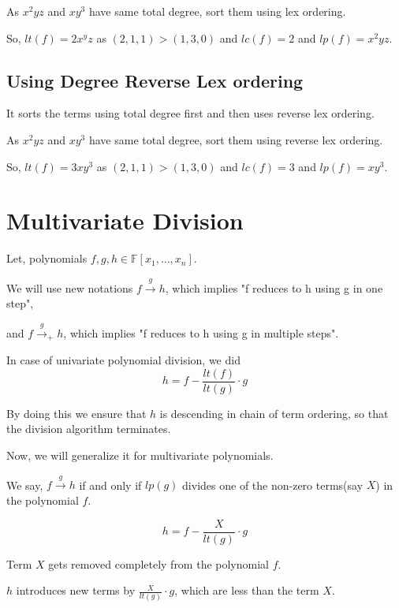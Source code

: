 As $x^2yz$ and $xy^3$ have same total degree, sort them using lex ordering.

So,  $lt(f) = 2x^yz$ as $(2,1,1)>(1,3,0)$ and $lc(f) = 2$ and $lp(f) = x^2yz$.

\subsection{Using Degree Reverse Lex ordering}

It sorts the terms using total degree first and then uses reverse lex ordering.

As $x^2yz$ and $xy^3$ have same total degree, sort them using reverse lex ordering.

So,  $lt(f) = 3xy^3$ as $(2,1,1)>(1,3,0)$ and $lc(f) = 3$ and $lp(f) = xy^3$.

\section{Multivariate Division}
Let, polynomials $f,g,h \in  \mathbb{F}[x_1, \ldots ,x_n]$.

We will use new notations $f \mathop \rightarrow \limits^{g} h$, which implies "f reduces to h using g in one step",

and $f {\mathop \rightarrow \limits^{g}}_{+} h$, which implies "f reduces to h using g in multiple steps".

In case of univariate polynomial division, we did
$$ h = f - \frac{lt(f)}{lt(g)}\cdot g$$

By doing this we ensure that $h$ is descending in chain of term ordering, so that the division algorithm terminates.

Now, we will generalize it for  multivariate polynomials.

\begin{definition}
We say, $f \mathop \rightarrow \limits^{g} h$ if and only if $lp(g)$ divides one of the non-zero terms(say $X$) in the polynomial $f$.

$$ h = f - \frac{X}{lt(g)}\cdot g$$
\end{definition}

\begin{observation}
Term $X$ gets removed completely from the polynomial $f$.
\end{observation}
\begin{observation}
$h$ introduces new terms by $\frac{X}{lt(g)}\cdot g$, which are less than the term $X$.
\end{observation}

